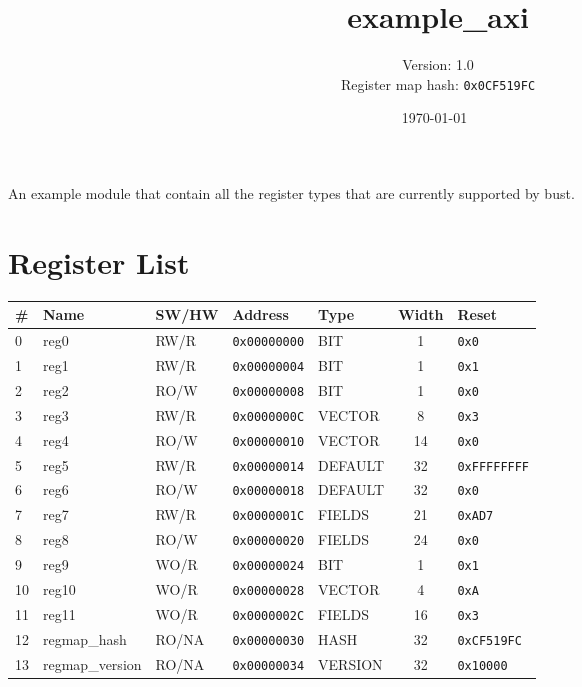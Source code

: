 \documentclass{article}
\title{example{\_}axi}
\author{Version: 1.0 \\ Register map hash: \texttt{0x0CF519FC}}
\date{\today\ \currenttime}
\begin{document}
\maketitle
\thispagestyle{fancy}

An example module that contain all the register types that are currently supported by bust.

\section{Register List}

\begin{table}[h!]
  \begin{center}
    \label{tab:table1}
    \begin{tabularx}{\linewidth}{|l|X|l|l|l|c|l|}
      \hline
      \textbf{\#} & \textbf{Name} & \textbf{SW/HW} & \textbf{Address} & \textbf{Type} & \textbf{Width} &
      \textbf{Reset} \\
      \hline
      0 & reg0 & RW/R & \texttt{0x00000000} & BIT & 1 & \texttt{0x0} \\
      \hline
      1 & reg1 & RW/R & \texttt{0x00000004} & BIT & 1 & \texttt{0x1} \\
      \hline
      2 & reg2 & RO/W & \texttt{0x00000008} & BIT & 1 & \texttt{0x0} \\
      \hline
      3 & reg3 & RW/R & \texttt{0x0000000C} & VECTOR & 8 & \texttt{0x3} \\
      \hline
      4 & reg4 & RO/W & \texttt{0x00000010} & VECTOR & 14 & \texttt{0x0} \\
      \hline
      5 & reg5 & RW/R & \texttt{0x00000014} & DEFAULT & 32 & \texttt{0xFFFFFFFF} \\
      \hline
      6 & reg6 & RO/W & \texttt{0x00000018} & DEFAULT & 32 & \texttt{0x0} \\
      \hline
      7 & reg7 & RW/R & \texttt{0x0000001C} & FIELDS & 21 & \texttt{0xAD7} \\
      \hline
      8 & reg8 & RO/W & \texttt{0x00000020} & FIELDS & 24 & \texttt{0x0} \\
      \hline
      9 & reg9 & WO/R & \texttt{0x00000024} & BIT & 1 & \texttt{0x1} \\
      \hline
      10 & reg10 & WO/R & \texttt{0x00000028} & VECTOR & 4 & \texttt{0xA} \\
      \hline
      11 & reg11 & WO/R & \texttt{0x0000002C} & FIELDS & 16 & \texttt{0x3} \\
      \hline
      12 & regmap{\_}hash & RO/NA & \texttt{0x00000030} & HASH & 32 & \texttt{0xCF519FC} \\
      \hline
      13 & regmap{\_}version & RO/NA & \texttt{0x00000034} & VERSION & 32 & \texttt{0x10000} \\
      \hline
    \end{tabularx}
  \end{center}
\end{table}
\end{document}
